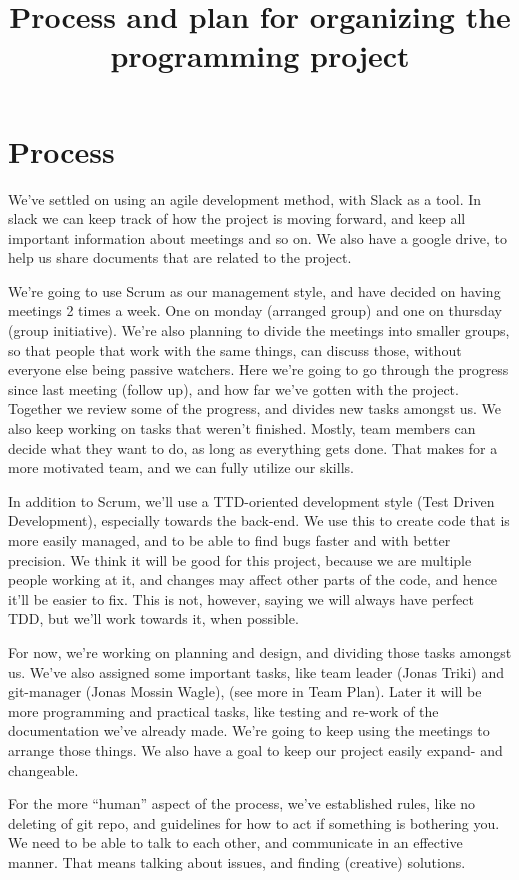 \documentclass{article}
\title{Process and plan for organizing the programming project}
\date{}
\begin{document}
\maketitle
\section*{Process}
We’ve settled on using an agile development method, with Slack as a tool. In slack we can keep track of how the project is moving forward, and keep all important information about meetings and so on. We also have a google drive, to help us share documents that are related to the project.

We’re going to use Scrum as our management style, and have decided on having meetings 2 times a week. One on monday (arranged group) and one on thursday (group initiative). We’re also planning to divide the meetings into smaller groups, so that people that work with the same things, can discuss those, without everyone else being passive watchers.
Here we’re going to go through the progress since last meeting (follow up), and how far we’ve gotten with the project. Together we review some of the progress, and divides new tasks amongst us. We also keep working on tasks that weren’t finished. Mostly, team members can decide what they want to do, as long as everything gets done. That makes for a more motivated team, and we can fully utilize our skills.

In addition to Scrum, we'll use a TTD-oriented development style (Test Driven Development), especially towards the back-end. We use this to create code that is more easily managed, and to be able to find bugs faster and with better precision. We think it will be good for this project, because we are multiple people working at it, and changes may affect other parts of the code, and hence it'll be easier to fix. This is not, however, saying we will always have perfect TDD, but we'll work towards it, when possible.

For now, we’re working on planning and design, and dividing those tasks amongst us. We’ve also assigned some important tasks, like team leader (Jonas Triki) and git-manager (Jonas Mossin Wagle), (see more in Team Plan). Later it will be more programming and practical tasks, like testing and re-work of the documentation we’ve already made. We’re going to keep using the meetings to arrange those things. We also have a goal to keep our project easily expand- and changeable.

For the more “human” aspect of the process, we’ve established rules, like no deleting of git repo, and guidelines for how to act if something is bothering you. We need to be able to talk to each other, and communicate in an effective manner. That means talking about issues, and finding (creative) solutions. 
\end{document}
